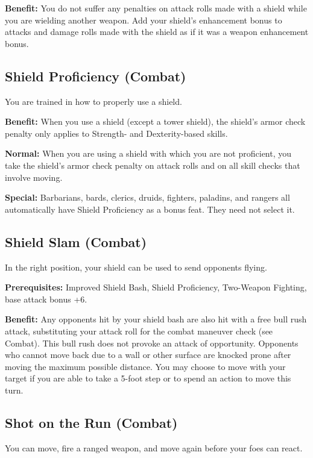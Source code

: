 \textbf{Benefit:} You do not suffer any penalties on attack rolls made with a shield while you are wielding another weapon. Add your shield's enhancement bonus to attacks and damage rolls made with the shield as if it was a weapon enhancement bonus.
				
\subsection{Shield Proficiency (Combat)}

				
You are trained in how to properly use a shield.
				
\textbf{Benefit:} When you use a shield (except a tower shield), the shield's armor check penalty only applies to Strength- and Dexterity-based skills.
				
\textbf{Normal:} When you are using a shield with which you are not proficient, you take the shield's armor check penalty on attack rolls and on all skill checks that involve moving.
				
\textbf{Special:} Barbarians, bards, clerics, druids, fighters, paladins, and rangers all automatically have Shield Proficiency as a bonus feat. They need not select it.
				
\subsection{Shield Slam (Combat)}

				
In the right position, your shield can be used to send opponents flying.
				
\textbf{Prerequisites:} Improved Shield Bash, Shield Proficiency, Two-Weapon Fighting, base attack bonus +6.
				
\textbf{Benefit:} Any opponents hit by your shield bash are also hit with a free bull rush attack, substituting your attack roll for the combat maneuver check (see Combat). This bull rush does not provoke an attack of opportunity. Opponents who cannot move back due to a wall or other surface are knocked prone after moving the maximum possible distance. You may choose to move with your target if you are able to take a 5-foot step or to spend an action to move this turn.
				
\subsection{Shot on the Run (Combat)}

				
You can move, fire a ranged weapon, and move again before your foes can react.
				
